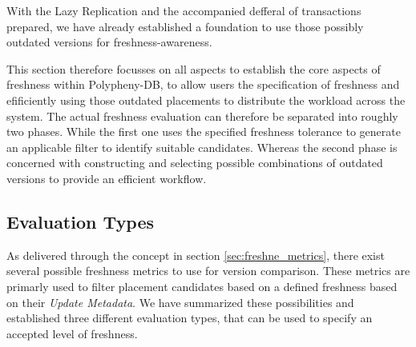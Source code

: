 With the Lazy Replication and the accompanied defferal of transactions prepared, we have already established a foundation to use those possibly outdated versions
for freshness-awareness.

This section therefore focusses on all aspects to establish the core aspects of freshness within Polypheny-DB,
to allow users the specification of freshness and efificiently using those outdated placements to distribute the workload across the system.
The actual freshness evaluation can therefore be separated into roughly two phases. While the first one uses the specified freshness tolerance to generate an 
applicable filter to identify suitable candidates. Whereas the second phase is concerned with constructing and selecting possible combinations of outdated versions
to provide an efficient workflow.



\subsection{Evaluation Types}
\label{sec:eval_types}

As delivered through the concept in section \ref{sec:freshne_metrics}, there exist several possible freshness metrics to use for version comparison.
These metrics are primarly used to filter placement candidates based on a defined freshness based on their \emph{Update Metadata}.
We have summarized these possibilities and established three different evaluation types, that can be used to specify an accepted level of freshness.


